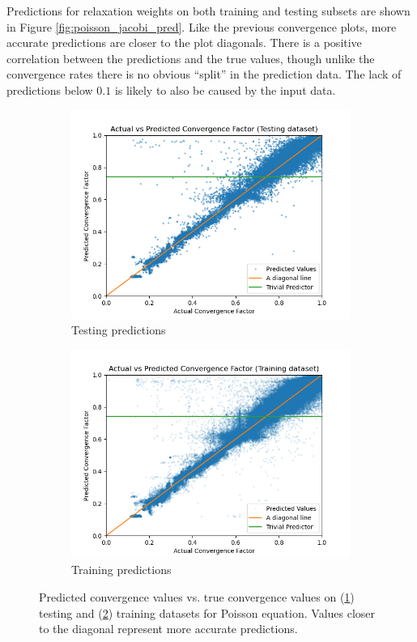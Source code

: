 \documentclass[review]{siamart190516}
\begin{document}
Predictions for relaxation weights on both training and testing subsets are shown in Figure \ref{fig:poisson_jacobi_pred}.  Like the previous convergence plots, more accurate predictions are closer to the plot diagonals.  There is a positive correlation between the predictions and the true values, though unlike the convergence rates there is no obvious ``split'' in the prediction data.  The lack of predictions below $0.1$ is likely to also be caused by the input data.

\begin{figure}[h]
  \centering
  \begin{subfigure}{.48\textwidth}
    \includegraphics[width=\textwidth]{figs/poisson_conv_test_pred.png}
    \caption{Testing predictions}
    \label{subfig:poisson_conv_test}
  \end{subfigure}
  \begin{subfigure}{.48\textwidth}
    \includegraphics[width=\textwidth]{figs/poisson_conv_train_pred.png}
    \caption{Training predictions}
    \label{subfig:poisson_conv_train}
  \end{subfigure}
  \caption{Predicted convergence values vs. true convergence values on (\ref{subfig:poisson_conv_test}) testing and (\ref{subfig:poisson_conv_train}) training datasets for Poisson equation. Values closer to the diagonal represent more accurate predictions. }
  \label{fig:poisson_conv_pred}
\end{figure}
\end{document}
